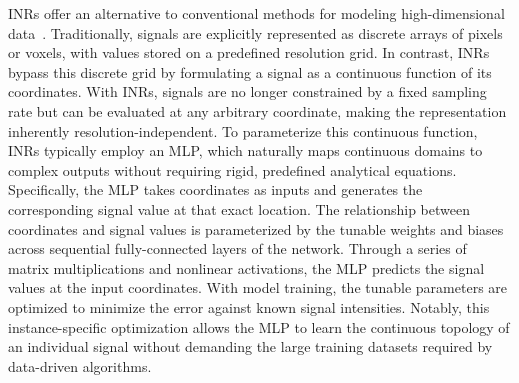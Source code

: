 \documentclass{optica-article}
\begin{document}
INRs offer an alternative to conventional methods for modeling high-dimensional data~\cite{park2019deepsdf, chen2019learning}. Traditionally, signals are explicitly represented as discrete arrays of pixels or voxels, with values stored on a predefined resolution grid.  In contrast, INRs bypass this discrete grid by formulating a signal as a continuous function of its coordinates. With INRs, signals are no longer constrained by a fixed sampling rate but can be evaluated at any arbitrary coordinate, making the representation inherently resolution-independent. To parameterize this continuous function, INRs typically employ an MLP, which naturally maps continuous domains to complex outputs without requiring rigid, predefined analytical equations. Specifically, the MLP takes coordinates as inputs and generates the corresponding signal value at that exact location. The relationship between coordinates and signal values is parameterized by the tunable weights and biases across sequential fully-connected layers of the network. Through a series of matrix multiplications and nonlinear activations, the MLP predicts the signal values at the input coordinates. With model training, the tunable parameters are optimized to minimize the error against known signal intensities. Notably, this instance-specific optimization allows the MLP to learn the continuous topology of an individual signal without demanding the large training datasets required by data-driven algorithms.


\end{document}
